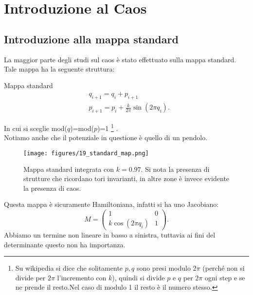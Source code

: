 \section{Introduzione al Caos}%
\label{sub:Lezione 19}
\mylocaltoc
\subsection{Introduzione alla mappa standard}%
\label{sub:Introduzione alla mappa standard}
La maggior parte degli studi sul caos è stato effettuato sulla mappa standard. Tale mappa ha la seguente struttura:
\begin{redbox}{Mappa standard}
 \[\begin{aligned}
    & q_{i+1} = q_i + p_{i+1}\\
    & p_{i+1} = p_i + \frac{k}{2\pi}\sin (2\pi q_i)
.\end{aligned}\]   
\end{redbox}
\noindent
In cui si sceglie mod($q$)=mod($p$)=1
\footnote{Su wikipedia si dice che solitamente $p, q$ sono presi modulo $2\pi$ (perché non si divide per $2\pi$ l'incremento con $k$), quindi si divide $p$ e $q$ per $2\pi$ ogni step e se ne prende il resto.Nel caso di modulo 1 il resto è il numero stesso.}
.\\
Notiamo anche che il potenziale in questione è quello di un pendolo.
\begin{figure}[H]
    \centering
    \texttt{[image: figures/19\_standard\_map.png]}
    \caption{\scriptsize Mappa standard integrata con $k=0.97$. Si nota la presenza di strutture che ricordano tori invarianti, in altre zone è invece evidente la presenza di caos.}
    \label{fig:figures-19_standard_map-png}
\end{figure}
\noindent
Questa mappa è sicuramente Hamiltoniana, infatti si ha uno Jacobiano:
\[
     M = 
     \begin{pmatrix}
	 1 & 0 \\
	 k \cos(2\pi q_i) & 1
     \end{pmatrix} 
.\] 
Abbiamo un termine non lineare in basso a sinistra, tuttavia ai fini del determinante questo non ha importanza.
